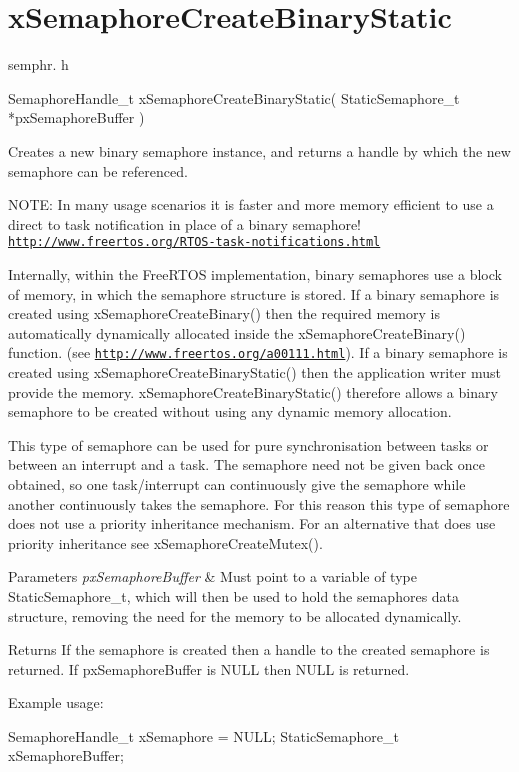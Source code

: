 \hypertarget{group__x_semaphore_create_binary_static}{}\section{x\+Semaphore\+Create\+Binary\+Static}
\label{group__x_semaphore_create_binary_static}
semphr. h 
\begin{DoxyPre}SemaphoreHandle\_t xSemaphoreCreateBinaryStatic( StaticSemaphore\_t *pxSemaphoreBuffer )\end{DoxyPre}


Creates a new binary semaphore instance, and returns a handle by which the new semaphore can be referenced.

N\+O\+TE\+: In many usage scenarios it is faster and more memory efficient to use a direct to task notification in place of a binary semaphore! \href{http://www.freertos.org/RTOS-task-notifications.html}{\tt http\+://www.\+freertos.\+org/\+R\+T\+O\+S-\/task-\/notifications.\+html}

Internally, within the Free\+R\+T\+OS implementation, binary semaphores use a block of memory, in which the semaphore structure is stored. If a binary semaphore is created using x\+Semaphore\+Create\+Binary() then the required memory is automatically dynamically allocated inside the x\+Semaphore\+Create\+Binary() function. (see \href{http://www.freertos.org/a00111.html}{\tt http\+://www.\+freertos.\+org/a00111.\+html}). If a binary semaphore is created using x\+Semaphore\+Create\+Binary\+Static() then the application writer must provide the memory. x\+Semaphore\+Create\+Binary\+Static() therefore allows a binary semaphore to be created without using any dynamic memory allocation.

This type of semaphore can be used for pure synchronisation between tasks or between an interrupt and a task. The semaphore need not be given back once obtained, so one task/interrupt can continuously \textquotesingle{}give\textquotesingle{} the semaphore while another continuously \textquotesingle{}takes\textquotesingle{} the semaphore. For this reason this type of semaphore does not use a priority inheritance mechanism. For an alternative that does use priority inheritance see x\+Semaphore\+Create\+Mutex().


\begin{DoxyParams}{Parameters}
{\em px\+Semaphore\+Buffer} & Must point to a variable of type Static\+Semaphore\+\_\+t, which will then be used to hold the semaphore\textquotesingle{}s data structure, removing the need for the memory to be allocated dynamically.\\
\hline
\end{DoxyParams}
\begin{DoxyReturn}{Returns}
If the semaphore is created then a handle to the created semaphore is returned. If px\+Semaphore\+Buffer is N\+U\+LL then N\+U\+LL is returned.
\end{DoxyReturn}
Example usage\+: 
\begin{DoxyPre}
SemaphoreHandle\_t xSemaphore = NULL;
StaticSemaphore\_t xSemaphoreBuffer;\end{DoxyPre}



